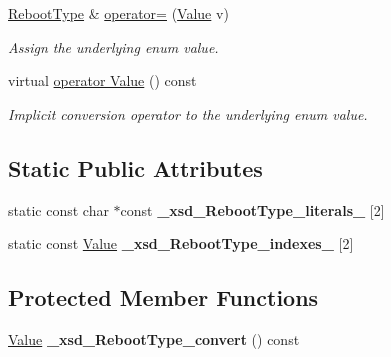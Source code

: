 \begin{DoxyCompactItemize}
\hyperlink{classopenstack_1_1xml_1_1RebootType}{RebootType} \& \hyperlink{classopenstack_1_1xml_1_1RebootType_a25a811061e251fee71f8a46277d4385f}{operator=} (\hyperlink{classopenstack_1_1xml_1_1RebootType_afe8138afe9dd78bfeaae341a94d6d793}{Value} v)
\begin{DoxyCompactList}\small\item\em Assign the underlying enum value. \item\end{DoxyCompactList}\item 
virtual \hyperlink{classopenstack_1_1xml_1_1RebootType_aa85d4af8611f456be2053ff31841cc1e}{operator Value} () const 
\begin{DoxyCompactList}\small\item\em Implicit conversion operator to the underlying enum value. \item\end{DoxyCompactList}\end{DoxyCompactItemize}
\subsection*{Static Public Attributes}
\begin{DoxyCompactItemize}
\item 
\hypertarget{classopenstack_1_1xml_1_1RebootType_a5d26caaba35cfe41d79e271089de0752}{
static const char $\ast$const {\bfseries \_\-xsd\_\-RebootType\_\-literals\_\-} \mbox{[}2\mbox{]}}
\label{classopenstack_1_1xml_1_1RebootType_a5d26caaba35cfe41d79e271089de0752}

\item 
\hypertarget{classopenstack_1_1xml_1_1RebootType_a5ab543e90a20efef366bd1311818c097}{
static const \hyperlink{classopenstack_1_1xml_1_1RebootType_afe8138afe9dd78bfeaae341a94d6d793}{Value} {\bfseries \_\-xsd\_\-RebootType\_\-indexes\_\-} \mbox{[}2\mbox{]}}
\label{classopenstack_1_1xml_1_1RebootType_a5ab543e90a20efef366bd1311818c097}

\end{DoxyCompactItemize}
\subsection*{Protected Member Functions}
\begin{DoxyCompactItemize}
\item 
\hypertarget{classopenstack_1_1xml_1_1RebootType_afdb489b7d10dc1b7c356a7b1f5995902}{
\hyperlink{classopenstack_1_1xml_1_1RebootType_afe8138afe9dd78bfeaae341a94d6d793}{Value} {\bfseries \_\-xsd\_\-RebootType\_\-convert} () const }
\label{classopenstack_1_1xml_1_1RebootType_afdb489b7d10dc1b7c356a7b1f5995902}

\end{DoxyCompactItemize}


